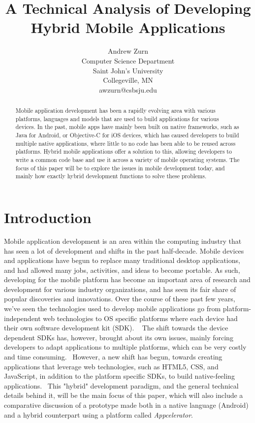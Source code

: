 \documentclass[11pt, twocolumn]{article}
\title{A Technical Analysis of Developing Hybrid Mobile Applications}
\author[1]{Andrew Zurn\\Computer Science Department\\Saint John's University\\Collegeville, MN\\awzurn@csbsju.edu}
\begin{document}
\maketitle
\begin{abstract}
Mobile application development has been a rapidly evolving area with various platforms, languages and models that are used to build applications for various devices.  In the past, mobile apps have mainly been built on native frameworks, such as Java for Android, or Objective-C for iOS devices, which has caused developers to build multiple native applications, where little to no code has been able to be reused across platforms.  Hybrid mobile applications offer a solution to this, allowing developers to write a common code base and use it across a variety of mobile operating systems.  The focus of this paper will be to explore the issues in mobile development today, and mainly how exactly hybrid development functions to solve these problems.\\
\end{abstract}

\section{Introduction}
\setlength\parindent{.75cm}
Mobile application development is an area within the computing industry that has seen a lot of development and shifts in the past half-decade.  Mobile devices and applications have begun to replace many traditional desktop applications, and had allowed many jobs, activities, and ideas to become portable.  As such, developing for the mobile platform has become an important area of research and development for various industry organizations, and has seen its fair share of popular discoveries and innovations.  Over the course of these past few years, we've seen the technologies used to develop mobile applications go from platform-independent web technologies to OS specific platforms where each device had their own software development kit (SDK). ~\cite{Corral2011}  The shift towards the device dependent SDKs has, however, brought about its own issues, mainly forcing developers to adapt applications to multiple platforms, which can be very costly and time consuming.~\cite{Leroux2011}  However, a new shift has begun, towards creating applications that leverage web technologies, such as HTML5, CSS, and JavaScript, in addition to the platform specific SDKs, to build native-feeling applications.~\cite{Xanthopoulos2013}  This "hybrid" development paradigm, and the general technical details behind it, will be the main focus of this paper, which will also include a comparative discussion of a prototype made both in a native language (Android) and a hybrid counterpart using a platform called {\it Appcelerator}.~\cite{Appcelerator} \\
\end{document}
